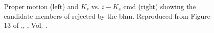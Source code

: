 \begin{figure}[ht!]
\begin{center}
\caption{Proper motion (left) and $K_s$ vs. $i-K_s$ \gls{cmd} (right) showing the candidate members of \citet{Bouy2015} rejected by the \gls{bhm}. Reproduced from Figure 13 of \citet{Olivares2017},\textit{}, , Vol. .}
\label{fig:rejecteds}
\end{center}
\end{figure}

\begin{figure}[htbp]
\begin{center}

\end{center}
\end{figure}
